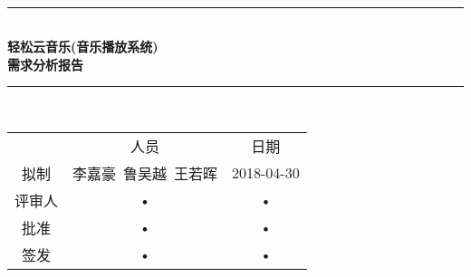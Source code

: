 \documentclass[bachelor]{ustcthesis}
\newcommand{\proname}{轻松云音乐}
\newcommand{\docname}{\proname (音乐播放系统)}
\newcommand{\HRule}{\rule{\linewidth}{0.5mm}}
\begin{document}
\begin{titlepage}
\begin{center}
~\\[5cm]
\HRule \\[0.4cm]
{\huge \bfseries \docname\\需求分析报告}\\[0.4cm]
\HRule \\[1.5cm]

\begin{tabular}{ccc}
  & 人员 & 日期 \\ 
拟制   & 李嘉豪\ 鲁吴越\ 王若晖 & 2018-04-30 \\ 
评审人 & • & • \\ 
批准   & • & • \\ 
签发   & • & • \\ 
\end{tabular} 

\end{center}
\end{titlepage}



\frontmatter

\tableofcontents
\listoffigures
\listoftables
% 

\mainmatter











\appendix


\end{document}
